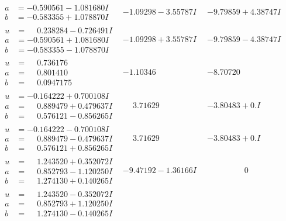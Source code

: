 \documentclass[1p]{elsarticle_modified}
\theoremstyle{definition}
\begin{document}
$$\begin{array}{c|c|c}
\begin{aligned}
a &= -0.590561 - 1.081680 I \\
b &= -0.583355 + 1.078870 I\end{aligned}
 & -1.09298 - 3.55787 I & -9.79859 + 4.38747 I \\ \hline\begin{aligned}
u &= \phantom{-}0.238284 - 0.726491 I \\
a &= -0.590561 + 1.081680 I \\
b &= -0.583355 - 1.078870 I\end{aligned}
 & -1.09298 + 3.55787 I & -9.79859 - 4.38747 I \\ \hline\begin{aligned}
u &= \phantom{-}0.736176\phantom{ +0.000000I} \\
a &= \phantom{-}0.801410\phantom{ +0.000000I} \\
b &= \phantom{-}0.0947175\phantom{ +0.000000I}\end{aligned}
 & -1.10346\phantom{ +0.000000I} & -8.70720\phantom{ +0.000000I} \\ \hline\begin{aligned}
u &= -0.164222 + 0.700108 I \\
a &= \phantom{-}0.889479 + 0.479637 I \\
b &= \phantom{-}0.576121 - 0.856265 I\end{aligned}
 & \phantom{-}3.71629\phantom{ +0.000000I} & -3.80483 + 0. I\phantom{ +0.000000I} \\ \hline\begin{aligned}
u &= -0.164222 - 0.700108 I \\
a &= \phantom{-}0.889479 - 0.479637 I \\
b &= \phantom{-}0.576121 + 0.856265 I\end{aligned}
 & \phantom{-}3.71629\phantom{ +0.000000I} & -3.80483 + 0. I\phantom{ +0.000000I} \\ \hline\begin{aligned}
u &= \phantom{-}1.243520 + 0.352072 I \\
a &= \phantom{-}0.852793 - 1.120250 I \\
b &= \phantom{-}1.274130 + 0.140265 I\end{aligned}
 & -9.47192 - 1.36166 I & \phantom{-0.000000 } 0 \\ \hline\begin{aligned}
u &= \phantom{-}1.243520 - 0.352072 I \\
a &= \phantom{-}0.852793 + 1.120250 I \\
b &= \phantom{-}1.274130 - 0.140265 I\end{aligned}

\end{array}$$
\end{document}
